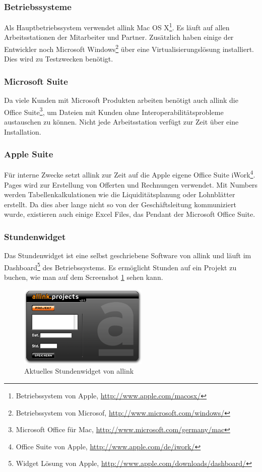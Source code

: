 \subsubsection{Betriebssysteme}
Als Hauptbetriebssystem verwendet allink Mac OS X\footnote{Betriebssystem von Apple, \url{http://www.apple.com/macosx/}}.
Es läuft auf allen Arbeitsstationen der Mitarbeiter und Partner. Zusätzlich haben einige der
Entwickler noch Microsoft Windows\footnote{Betriebssystem von Microsof, \url{http://www.microsoft.com/windows/}}
über eine Virtualisierungslösung installiert. Dies wird zu Testzwecken benötigt.

\subsubsection{Microsoft Suite}
Da viele Kunden mit Microsoft Produkten arbeiten benötigt auch allink die
Office Suite\footnote{Microsoft Office für Mac, \url{http://www.microsoft.com/germany/mac}}, 
um Dateien mit Kunden ohne Interoperabilitätsprobleme
austauschen zu können. Nicht jede Arbeitsstation verfügt zur Zeit über eine
Installation.

\subsubsection{Apple Suite}
Für interne Zwecke setzt allink zur Zeit auf die Apple eigene Office Suite
iWork\footnote{Office Suite von Apple, \url{http://www.apple.com/de/iwork/}}.
Pages wird zur Erstellung von Offerten und Rechnungen verwendet. Mit Numbers
werden Tabellenkalkulationen wie die Liquiditätsplanung oder Lohnblätter erstellt.
Da dies aber lange nicht so von der Geschäftsleitung kommuniziert wurde, existieren
auch einige Excel Files, das Pendant der Microsoft Office Suite.

\subsubsection{Stundenwidget}
Das Stundenwidget ist eine selbst geschriebene Software von allink und läuft
im Dashboard\footnote{Widget Lösung von Apple, \url{http://www.apple.com/downloads/dashboard/}} des Betriebssystems.
Es ermöglicht Stunden auf ein Projekt zu buchen, wie man auf dem Screenshot \ref{pic:ist_widget}
sehen kann.

\begin{figure}[htbp]
\begin{center}
\includegraphics[width=0.55\textwidth,angle=0]{./bilder/analyse/ist_widget.png}
\caption{Aktuelles Stundenwidget von allink}
\label{pic:ist_widget}
\end{center}
\end{figure}

